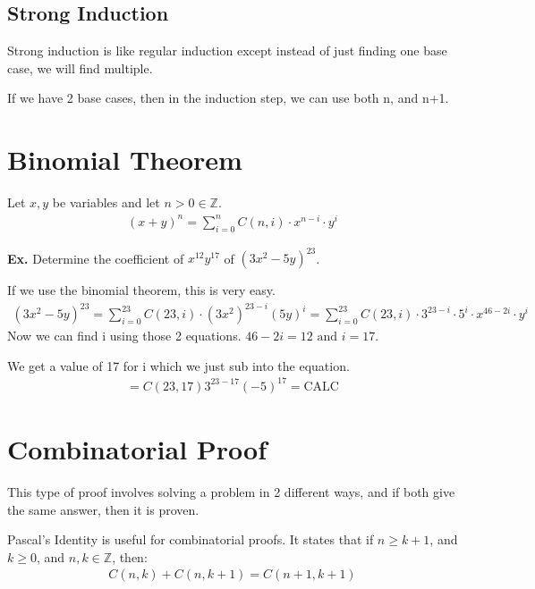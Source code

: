 \documentclass[12pt,letterpaper]{article} \usepackage{amsmath} \usepackage{graphicx}  \usepackage{longtable}  \usepackage{amssymb}
\begin{document}
        \subsection{Strong Induction}
        Strong induction is like regular induction except instead of just finding one base case, we will find multiple. 

        If we have 2 base cases, then in the induction step, we can use both n, and n+1. 

    \section{Binomial Theorem}
    Let $x,y$ be variables and let $n>0 \in \mathbb{Z}$.
    \begin{align*}
        (x+y)^n = \sum_{i=0} ^n C(n,i) \cdot x^{n-i} \cdot y^i
    \end{align*}

    \begin{mdframed}
        \textbf{Ex. } Determine the coefficient of $x^{12}y^{17}$ of $(3x^2-5y)^{23}$.

        If we use the binomial theorem, this is very easy.
        \begin{align*}
            (3x^2-5y)^{23} = \sum_{i=0}^{23} C(23,i)\cdot (3x^2)^{23-i}(5y)^i = \sum_{i=0}^{23} C(23,i)\cdot 3^{23-i}\cdot 5^i\cdot x^{46-2i}\cdot y^i
        \end{align*}
        Now we can find i using those 2 equations. $46-2i = 12 \text{ and } i = 17$.

        We get a value of 17 for i which we just sub into the equation.
        \begin{align*}
            = C(23,17)3^{23-17}(-5)^{17} = \text{CALC}
        \end{align*}
    \end{mdframed}
    
    \section{Combinatorial Proof}
    This type of proof involves solving a problem in 2 different ways, and if both give the same answer, then it is proven.

    Pascal's Identity is useful for combinatorial proofs. It states that if $n\ge k+1$, and $k\ge 0$, and $n,k \in \mathbb{Z}$, then:
    \begin{align*}
        C(n,k) + C(n,k+1) = C(n+1, k+1)
    \end{align*}
\end{document}
